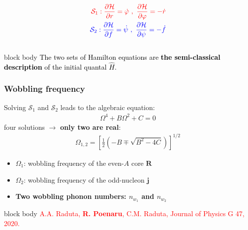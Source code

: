 \documentclass{beamer}
\begin{document}
\begin{frame}
\begin{columns}
\begin{column}{0.4\textwidth}
			\begin{align}
				{\color{red}\mathcal{S}_1: \frac{\partial \mathcal{H}}{\partial r}=\dot{\varphi}\ ,\ \frac{\partial \mathcal{H}}{\partial \varphi}=-\dot{r}}\nonumber\\
				{\color{blue}\mathcal{S}_2: \frac{\partial \mathcal{H}}{\partial f}=\dot{\psi}\ ,\ \frac{\partial \mathcal{H}}{\partial \psi}=-\dot{f}}\nonumber
			\end{align}
		\end{column}
	\end{columns}
	\begin{beamercolorbox}[rounded=true,shadow=false, wd=\linewidth,]{block body}
		\centering
		\textcolor{black}{\small{The two sets of Hamilton equations are \textbf{the semi-classical description} of the initial quantal $\hat{H}$.}}
	\end{beamercolorbox}
\end{frame}


\begin{frame}
	\frametitle{Wobbling frequency}
	Solving {\color{red}$\mathcal{S}_1$} and {\color{blue}$\mathcal{S}_2$} leads to the algebraic equation:
	\begin{align}
		\Omega^4+B\Omega^2+C=0\nonumber
	\end{align}
	four solutions $\longrightarrow$ \textbf{only two are real}:
	\begin{align}
		\Omega_{1,2}=\left[\frac{1}{2}\left(-B\mp\sqrt{B^2-4C}\right)\right]^{1/2}\nonumber
	\end{align}
	\begin{itemize}
		\item {\color{red}$\Omega_1$}: wobbling frequency of the {\color{red}even-$A$ core $\mathbf{R}$}
		\item {\color{blue}$\Omega_2$}: wobbling frequency of the {\color{blue}odd-nucleon $\mathbf{j}$}
		\item \textbf{Two wobbling phonon numbers: {\color{red}$n_{w_1}$} and {\color{blue}$n_{w_2}$}}
	\end{itemize}
	\begin{beamercolorbox}[rounded=true,shadow=false, wd=\linewidth,]{block body}
		\centering
		\textcolor{red}{\footnotesize{A.A. Raduta, \textbf{R. Poenaru}, C.M. Raduta, Journal of Physics G 47, 2020.}}
	\end{beamercolorbox}
\end{frame}
\end{document}

